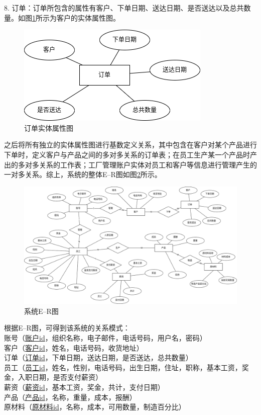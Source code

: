 8. 订单：订单所包含的属性有客户、下单日期、送达日期、是否送达以及总共数量。如图\ref{fig:4oderf}所示为客户的实体属性图。

\begin{figure}[H]
    \centering
    \includegraphics[width=.45\textwidth]{figures/4oderf.png}
    \caption{订单实体属性图}
    \label{fig:4oderf}
\end{figure}

之后将所有独立的实体属性图进行基数定义关系，其中包含在客户对某个产品进行下单时，定义客户与产品之间的多对多关系的订单表；在员工生产某一个产品时产出的多对多关系的工作表；工厂管理账户实体对员工和客户等信息进行管理产生的一对多关系。综上，系统的整体E--R图如图\ref{fig:4totalerf}所示。

\begin{figure}[H]
    \centering
    \includegraphics[width=\textwidth]{figures/4totalerf.png}
    \caption{系统E--R图}
    \label{fig:4totalerf}
\end{figure}

根据E--R图，可得到该系统的关系模式：\\
账号（\underline{账户id}，组织名称，电子邮件，电话号码，用户名，密码）\\
客户（\underline{客户id}，姓名，电话号码，收货地址）\\
订单（\underline{订单id}，下单日期，送达日期，是否送达，总共数量）\\
员工（\underline{员工id}，姓名，性别，电话号码，出生日期，住址，职称，基本工资，奖金，入职日期，是否支付薪资）\\
薪资（\underline{薪资id}，基本工资，奖金，共计，支付日期）\\
产品（\underline{产品id}，名称，重量，成本，报酬）\\
原材料（\underline{原材料id}，名称，成本，可用数量，制造百分比）

